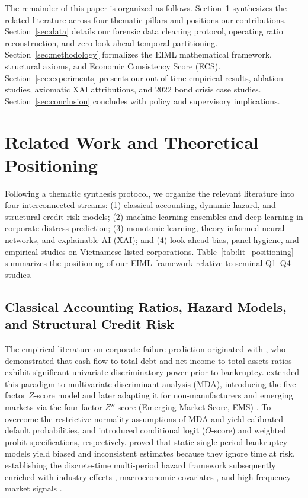 \documentclass[11pt,a4paper]{article}
\begin{document}
The remainder of this paper is organized as follows. Section~\ref{sec:literature} synthesizes the related literature across four thematic pillars and positions our contributions. Section~\ref{sec:data} details our forensic data cleaning protocol, operating ratio reconstruction, and zero-look-ahead temporal partitioning. Section~\ref{sec:methodology} formalizes the EIML mathematical framework, structural axioms, and Economic Consistency Score (ECS). Section~\ref{sec:experiments} presents our out-of-time empirical results, ablation studies, axiomatic XAI attributions, and 2022 bond crisis case studies. Section~\ref{sec:conclusion} concludes with policy and supervisory implications.

\section{Related Work and Theoretical Positioning}
\label{sec:literature}

Following a thematic synthesis protocol, we organize the relevant literature into four interconnected streams: (1) classical accounting, dynamic hazard, and structural credit risk models; (2) machine learning ensembles and deep learning in corporate distress prediction; (3) monotonic learning, theory-informed neural networks, and explainable AI (XAI); and (4) look-ahead bias, panel hygiene, and empirical studies on Vietnamese listed corporations. Table~\ref{tab:lit_positioning} summarizes the positioning of our EIML framework relative to seminal Q1--Q4 studies.

\subsection{Classical Accounting Ratios, Hazard Models, and Structural Credit Risk}
The empirical literature on corporate failure prediction originated with \citet{beaver1966financial}, who demonstrated that cash-flow-to-total-debt and net-income-to-total-assets ratios exhibit significant univariate discriminatory power prior to bankruptcy. \citet{altman1968financial} extended this paradigm to multivariate discriminant analysis (MDA), introducing the five-factor $Z$-score model and later adapting it for non-manufacturers and emerging markets via the four-factor $Z''$-score (Emerging Market Score, EMS) \citep{altman1995emerging,altman2017financial}. To overcome the restrictive normality assumptions of MDA and yield calibrated default probabilities, \citet{ohlson1980financial} and \citet{zmijewski1984methodological} introduced conditional logit ($O$-score) and weighted probit specifications, respectively. \citet{shumway2001forecasting} proved that static single-period bankruptcy models yield biased and inconsistent estimates because they ignore time at risk, establishing the discrete-time multi-period hazard framework subsequently enriched with industry effects \citep{chava2004bankruptcy}, macroeconomic covariates \citep{tinoco2013financial,bauer2014are}, and high-frequency market signals \citep{campbell2008search}.
\end{document}
